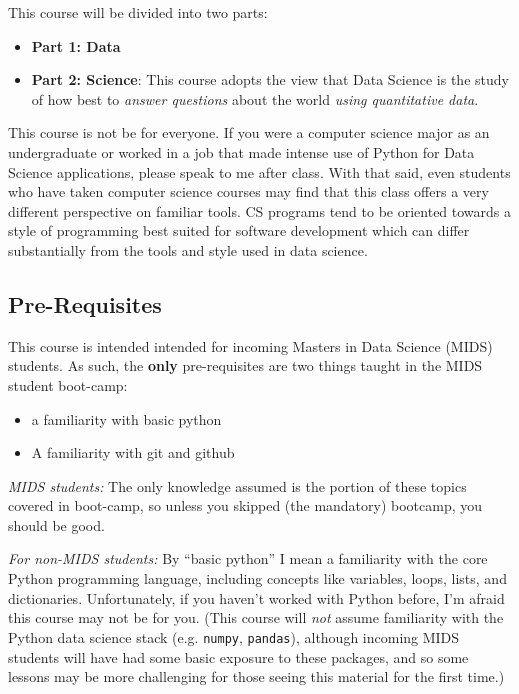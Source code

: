 \documentclass[12pt]{article}
\begin{document}
This course will be divided into two parts:

\begin{itemize}
	\item \textbf{Part 1: Data}
	\item \textbf{Part 2: Science}: This course adopts the view that Data Science is the study of how best to \emph{answer questions} about the world \emph{using quantitative data}.
\end{itemize}




This course is not be for everyone. If you were a computer science major as an undergraduate or worked in a job that made intense use of Python for Data Science applications, please speak to me after class. With that said, even students who have taken computer science courses may find that this class offers a very different perspective on familiar tools. CS programs tend to be oriented towards a style of programming best suited for software development which can differ substantially from the tools and style used in data science.

\subsection{Pre-Requisites}

This course is intended intended for incoming Masters in Data Science (MIDS) students. As such, the \textbf{only} pre-requisites are two things taught in the MIDS student boot-camp:
\begin{itemize}
	\item a familiarity with basic python
	\item A familiarity with git and github
\end{itemize}

\emph{MIDS students:}
The only knowledge assumed is the portion of these topics covered in boot-camp, so unless you skipped (the mandatory) bootcamp, you should be good.

\emph{For non-MIDS students:}
By ``basic python'' I mean a familiarity with the core Python programming language, including concepts like variables, loops, lists, and dictionaries. Unfortunately, if you haven't worked with Python before, I'm afraid this course may not be for you. (This course will \emph{not} assume familiarity with the Python data science stack (e.g. \texttt{numpy}, \texttt{pandas}), although incoming MIDS students will have had some basic exposure to these packages, and so some lessons may be more challenging for those seeing this material for the first time.)
\end{document}
